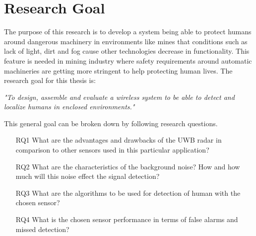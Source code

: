 \section{Research Goal}
\label{ResearchGoal}
The purpose of this research is to develop a system being able to protect humans around dangerous machinery in environments like mines that conditions such as lack of light, dirt and fog cause other technologies decrease in functionality. This feature is needed in mining industry where safety requirements around automatic machineries are getting more stringent to help protecting human lives. 
The research goal for this thesis is:

\textit{"To design, assemble and evaluate a wireless system to be able to detect and localize humans in enclosed environments."}

This general goal can be broken down by following research questions.
\begin{enumerate}
\item [RQ1] {What are the advantages and drawbacks of the UWB radar in comparison to other sensors used in this particular application?}\\ 
\item[RQ2] {What are the characteristics of the background noise? How and how much will this noise effect the signal detection?}\\ 
\item[RQ3] {What are the algorithms to be used for detection of human with the chosen sensor?}\\
\item[RQ4] {What is the chosen sensor performance in terms of false alarms and missed detection?}\\ 
\end{enumerate}
